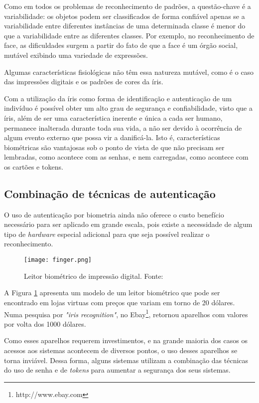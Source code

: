 \begin{citacao}
Como em todos os problemas de reconhecimento de padrões, a questão-chave é a variabilidade: os objetos podem ser classificados de forma confiável apenas se a variabilidade entre diferentes instâncias de uma determinada classe é menor do que a variabilidade entre as diferentes classes. Por exemplo, no reconhecimento de face, as dificuldades surgem a partir do fato de que a face é um órgão social, mutável exibindo uma variedade de expressões. \cite{Daugman2004}
\end{citacao}

Algumas características fisiológicas não têm essa natureza mutável, como é o caso das impressões digitais e os padrões de cores da íris.

\begin{citacao}
Com a utilização da íris como forma de identificação e autenticação de um indivíduo é possível obter um alto grau de segurança e confiabilidade, visto que a íris, além de ser uma característica inerente e única a cada ser humano, permanece inalterada durante toda sua vida, a não ser devido à ocorrência de algum evento externo que possa vir a danificá-la. Isto é, características biométricas são vantajosas sob o ponto de vista de que não precisam ser lembradas, como acontece com as senhas, e nem carregadas, como acontece com os cartões e tokens. \cite{priscila2007}
\end{citacao}

\subsection{Combinação de técnicas de autenticação}
O uso de autenticação por biometria ainda não oferece o custo benefício necessário para ser aplicado em grande escala, pois existe a necessidade de algum tipo de \textit{hardware} especial adicional para que seja possível realizar o reconhecimento.

\begin{figure}[!htb]
	\centering
	\texttt{[image: finger.png]}
	\small
	\caption[Leitor biométrico de impressão digital]{Leitor biométrico de impressão digital. Fonte: \cite{ebay}}
	\label{fig:finger}
\end{figure}

A Figura \ref{fig:finger} apresenta um modelo de um leitor biométrico que pode ser encontrado em lojas virtuas com preços que variam em torno de 20 dólares. Numa pesquisa por \textit{"iris recognition"}, no Ebay\footnote{http://www.ebay.com}, retornou aparelhos com valores por volta dos 1000 dólares.

Como esses aparelhos requerem investimentos, e na grande maioria dos casos os acessos aos sistemas acontecem de diversos pontos, o uso desses aparelhos se torna inviável.
Dessa forma, alguns sistemas utilizam a combinação das técnicas do uso de senha e de \textit{tokens} para aumentar a segurança dos seus sistemas.
